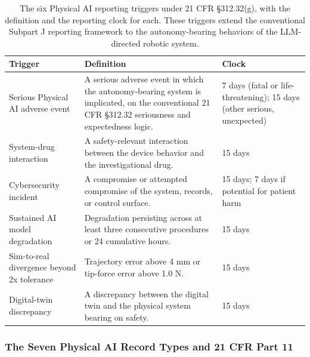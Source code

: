 \begin{table}[htbp]
\centering
\footnotesize
\caption{The six Physical AI reporting triggers under 21 CFR \S 312.32(g), with the
definition and the reporting clock for each. These triggers extend the conventional
Subpart J reporting framework to the autonomy-bearing behaviors of the LLM-directed
robotic system.}
\label{tab:pai-triggers}
\begin{tabularx}{\textwidth}{L{4.0cm} Y L{2.8cm}}
\toprule
\textbf{Trigger} & \textbf{Definition} & \textbf{Clock} \\
\midrule
Serious Physical AI adverse event & A serious adverse event in which the autonomy-bearing system is implicated, on the conventional 21 CFR \S 312.32 seriousness and expectedness logic. & 7 days (fatal or life-threatening); 15 days (other serious, unexpected) \\
System-drug interaction & A safety-relevant interaction between the device behavior and the investigational drug. & 15 days \\
Cybersecurity incident & A compromise or attempted compromise of the system, records, or control surface. & 15 days; 7 days if potential for patient harm \\
Sustained AI model degradation & Degradation persisting across at least three consecutive procedures or 24 cumulative hours. & 15 days \\
Sim-to-real divergence beyond 2x tolerance & Trajectory error above 4 mm or tip-force error above 1.0 N. & 15 days \\
Digital-twin discrepancy & A discrepancy between the digital twin and the physical system bearing on safety. & 15 days \\
\bottomrule
\end{tabularx}
\end{table}
\vspace*{-0.55cm}

\subsubsection{The Seven Physical AI Record Types and 21 CFR Part 11}

